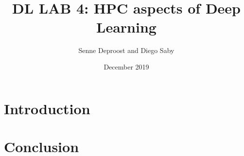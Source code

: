 \documentclass[11pt]
{article}
\title{DL LAB 4: HPC aspects of Deep Learning}
\author{Senne Deproost and Diego Saby}
\date{December 2019}
\begin{document}
\maketitle
\section{Introduction}




\section{Conclusion}




\end{document}
